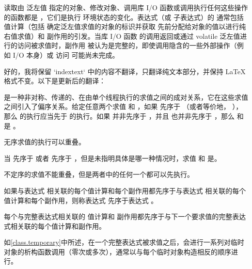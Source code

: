 \pnum
{}%
读取由 
泛左值 指定的对象、修改对象、调用库 I/O
函数或调用执行任何这些操作的函数都是
，它们是执行
环境状态的变化。表达式（或
子表达式）的  通常包括值计算（包括
确定泛左值求值的对象的标识并获取
先前分配给对象的值以进行纯右值求值）和
副作用的引发。当库 I/O 函数
的调用返回或通过 volatile 泛左值进行的访问被求值时，副作用
被认为是完整的，即使调用隐含的一些外部操作（例如 I/O 本身）或  访问
可能尚未完成。

好的，我将保留 `indextext` 中的内容不翻译，只翻译纯文本部分，并保持 LaTeX 格式不变。以下是更新后的翻译：

\pnum
{} 是一种非对称、传递的、在由单个线程执行的求值之间的成对关系，它在这些求值之间引入了偏序关系。给定任意两个求值  和 ，如果  先序于 （或者等价地，  ），那么  的执行应当先于  的执行。如果  并非先序于 ，并且  也并非先序于 ，那么  和  是 。
\begin{note}
无序求值的执行可以重叠。
\end{note}
当  先序于  或者  先序于 ，但是未指明具体是哪一种情况时，求值  和  是。
\begin{note}
不定序的求值不能重叠，但是两者中的任何一个都可以先执行。
\end{note}
如果与表达式  相关联的每个值计算和每个副作用都先序于与表达式  相关联的每个值计算和每个副作用，则称表达式  先序于表达式 。

\pnum
每个与完整表达式相关联的
%
值计算和
%
副作用都先序于与下一个要求值的完整表达式相关联的每个值计算和副作用。
\begin{footnote}
如\ref{class.temporary}中所述，在一个完整表达式被求值之后，会进行一系列对临时对象的析构函数调用（零次或多次），通常以与每个临时对象构造相反的顺序进行。
\end{footnote}

